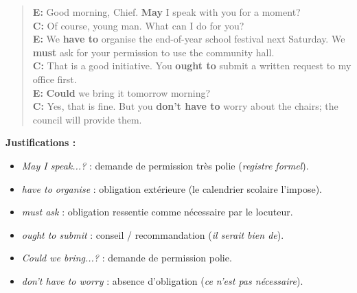 \documentclass[11pt]{article}
\begin{document}
\begin{corrige}

\begin{quote}
\textbf{E:} Good morning, Chief. \textbf{May} I speak with you for a moment? \\
\textbf{C:} Of course, young man. What can I do for you? \\
\textbf{E:} We \textbf{have to} organise the end-of-year school festival next Saturday. We \textbf{must} ask for your permission to use the community hall. \\
\textbf{C:} That is a good initiative. You \textbf{ought to} submit a written request to my office first. \\
\textbf{E:} \textbf{Could} we bring it tomorrow morning? \\
\textbf{C:} Yes, that is fine. But you \textbf{don't have to} worry about the chairs; the council will provide them.
\end{quote}

\textbf{Justifications :}
\begin{itemize}
\item \emph{May I speak...?} : demande de permission très polie (\emph{registre formel}).
\item \emph{have to organise} : obligation extérieure (le calendrier scolaire l'impose).
\item \emph{must ask} : obligation ressentie comme nécessaire par le locuteur.
\item \emph{ought to submit} : conseil / recommandation (\emph{il serait bien de}).
\item \emph{Could we bring...?} : demande de permission polie.
\item \emph{don't have to worry} : absence d'obligation (\emph{ce n'est pas nécessaire}).
\end{itemize}
\end{corrige}
\end{document}
